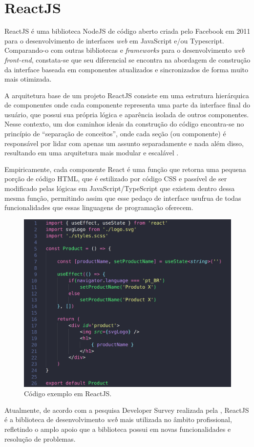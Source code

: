 \section{ReactJS}
\label{sec:reactJS}
ReactJS é uma biblioteca NodeJS de código aberto criada pelo Facebook em 2011 para o desenvolvimento de interfaces \textit{web} em JavaScript e/ou Typescript. Comparando-o com outras bibliotecas e \textit{frameworks} para o desenvolvimento \textit{web front-end}, constata-se que seu diferencial se encontra na abordagem de construção da interface baseada em componentes atualizados e sincronizados de forma muito mais otimizada.

A arquitetura base de um projeto ReactJS consiste em uma estrutura hierárquica de componentes onde cada componente representa uma parte da interface final do usuário, que possui sua própria lógica e aparência isolada de outros componentes. Nesse contexto, um dos caminhos ideais da construção do código encontra-se no princípio de “separação de conceitos”, onde cada seção (ou componente) é responsável por lidar com apenas um assunto separadamente e nada além disso, resultando em uma arquitetura mais modular e escalável \cite{Qawwas2022}.

Empiricamente, cada componente React é uma função que retorna uma pequena porção de código HTML, que é estilizado por código CSS e passível de ser modificado pelas lógicas em JavaScript/TypeScript que existem dentro dessa mesma função, permitindo assim que esse pedaço de interface usufrua de todas funcionalidades que essas linguagens de programação oferecem.

\begin{figure}[H]
    \centering
    \caption{Código exemplo em ReactJS.}
    \label{fig:reactJS}
    \includegraphics[width=.7\textwidth]{data/figures/react.png}
\end{figure}

Atualmente, de acordo com a pesquisa Developer Survey realizada pela , ReactJS é a biblioteca de desenvolvimento \textit{web} mais utilizada no âmbito profissional, refletindo o amplo apoio que a biblioteca possui em novas funcionalidades e resolução de problemas.